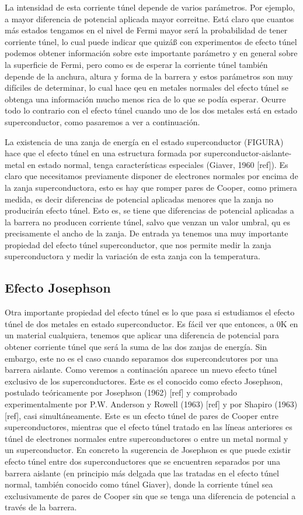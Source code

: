 La intensidad de esta corriente túnel depende de varios parámetros. Por ejemplo, a mayor diferencia de potencial aplicada mayor correitne. Está claro que cuantos más estados tengamos en el nivel de Fermi mayor será la probabilidad de tener corriente túnel, lo cual puede indicar que quizáß con experimentos de efecto túnel podemos obtener información sobre este importante parámetro y en general sobre la superficie de Fermi, pero como es de esperar la corriente túnel también depende de la anchura, altura y forma de la barrera y estos parámetros son muy difíciles de determinar, lo cual hace qeu en metales normales del efecto túnel se obtenga una información mucho menos rica de lo que se podía esperar. Ocurre todo lo contrario con el efecto túnel cuando uno de los dos metales está en estado superconductor, como pasaremos a ver a continuación.

La existencia de una zanja de energía en el estado superconductor (FIGURA) hace que el efecto túnel en una estructura formada por superconductor-aislante-metal en estado normal, tenga características especiales (Giaver, 1960 [ref]). Es claro que necesitamos previamente disponer de electrones normales por encima de la zanja superconductora, esto es hay que romper pares de Cooper, como primera medida, es decir diferencias de potencial aplicadas menores que la zanja no producirán efecto túnel. Esto es, se tiene que diferencias de potencial aplicadas a la barrera no producen corriente túnel, salvo que venzan un valor umbral, qu es precisamente el ancho de la zanja. De entrada ya tenemos una muy importante propiedad del efecto túnel superconductor, que nos permite medir la zanja superconductora y medir la variación de esta zanja con la temperatura.

\subsection{Efecto Josephson}

Otra importante propiedad del efecto túnel es lo que pasa si estudiamos el efecto túnel de dos metales en estado superconductor. Es fácil ver que entonces, a 0K en un material cualquiera, tenemos que aplicar una diferencia de potencial para obtener corriente túnel que será la suma de las dos zanjas de energía. Sin embargo, este no es el caso cuando separamos dos supercondcutores por una barrera aislante. Como veremos a continación aparece un nuevo efecto túnel exclusivo de los superconductores. Este es el conocido como efecto Josephson, postulado teóricamente por Josephson (1962) [ref] y comprobado experimentalmente por P.W. Anderson y Rowell (1963) [ref] y por Shapiro (1963) [ref], casi simultáneamente. Este es un efecto túnel de pares de Cooper entre superconductores, mientras que el efecto túnel tratado en las líneas anteriores es túnel de electrones normales entre superconductores o entre un metal normal y un superconductor. En concreto la sugerencia de Josephson es que puede existir efecto túnel entre dos superconductores que se encuentren separados por una barrera aislante (en principio más delgada que las tratadas en el efecto túnel normal, también conocido como túnel Giaver), donde la corriente túnel sea exclusivamente de pares de Cooper sin que se tenga una diferencia de potencial a través de la barrera.

